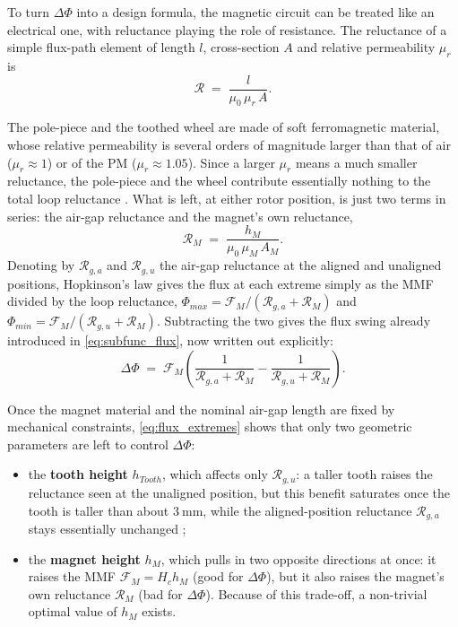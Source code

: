 To turn $\Delta\Phi$ into a design formula, the magnetic circuit can be treated like an electrical one, with reluctance playing the role of resistance. The reluctance of a simple flux-path element of length $l$, cross-section $A$ and relative permeability $\mu_r$ is
\begin{equation}
    \mathcal{R} \;=\; \frac{l}{\mu_0\,\mu_r\,A}.
    \label{eq:reluctance_def}
\end{equation}

The pole-piece and the toothed wheel are made of soft ferromagnetic material, whose relative permeability is several orders of magnitude larger than that of air ($\mu_r\approx 1$) or of the PM ($\mu_r\approx 1.05$). Since a larger $\mu_r$ means a much smaller reluctance, the pole-piece and the wheel contribute essentially nothing to the total loop reluctance \cite{xuDesignModelingOptimization2019a}. What is left, at either rotor position, is just two terms in series: the air-gap reluctance and the magnet's own reluctance,
\begin{equation}
    \mathcal{R}_M \;=\; \frac{h_M}{\mu_0\,\mu_M\,A_M}.
    \label{eq:magnet_reluctance}
\end{equation}
Denoting by $\mathcal{R}_{g,a}$ and $\mathcal{R}_{g,u}$ the air-gap reluctance at the aligned and unaligned positions, Hopkinson's law gives the flux at each extreme simply as the MMF divided by the loop reluctance, $\Phi_{max}=\mathcal{F}_M/(\mathcal{R}_{g,a}+\mathcal{R}_M)$ and $\Phi_{min}=\mathcal{F}_M/(\mathcal{R}_{g,u}+\mathcal{R}_M)$. Subtracting the two gives the flux swing already introduced in \eqref{eq:subfunc_flux}, now written out explicitly:
\begin{equation}
    \Delta\Phi \;=\; \mathcal{F}_M\left(\frac{1}{\mathcal{R}_{g,a}+\mathcal{R}_M} - \frac{1}{\mathcal{R}_{g,u}+\mathcal{R}_M}\right).
    \label{eq:flux_extremes}
\end{equation}

Once the magnet material and the nominal air-gap length are fixed by mechanical constraints, \eqref{eq:flux_extremes} shows that only two geometric parameters are left to control $\Delta\Phi$:
\begin{itemize}
    \item the \textbf{tooth height} $h_{Tooth}$, which affects only $\mathcal{R}_{g,u}$: a taller tooth raises the reluctance seen at the unaligned position, but this benefit saturates once the tooth is taller than about $3\ \text{mm}$, while the aligned-position reluctance $\mathcal{R}_{g,a}$ stays essentially unchanged \cite{xuDesignModelingOptimization2019a};
    \item the \textbf{magnet height} $h_M$, which pulls in two opposite directions at once: it raises the MMF $\mathcal{F}_M=H_ch_M$ (good for $\Delta\Phi$), but it also raises the magnet's own reluctance $\mathcal{R}_M$ (bad for $\Delta\Phi$). Because of this trade-off, a non-trivial optimal value of $h_M$ exists.
\end{itemize}

